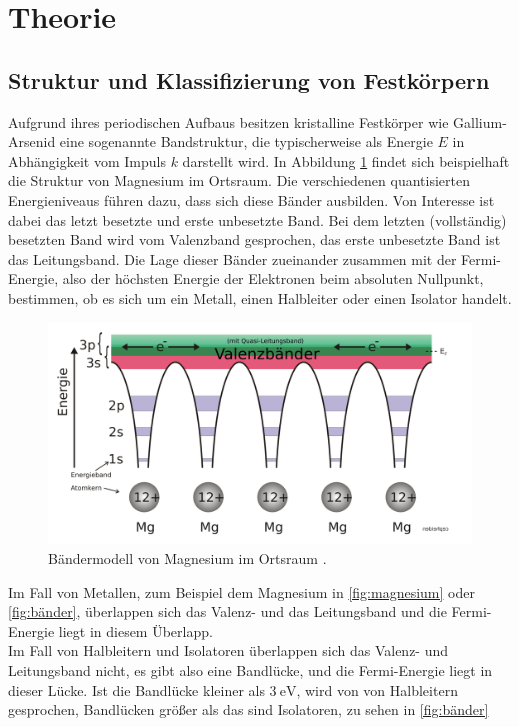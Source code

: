 \section{Theorie}
\label{sec:Theorie}

\subsection{Struktur und Klassifizierung von Festkörpern}
Aufgrund ihres periodischen Aufbaus besitzen kristalline Festkörper wie Gallium-Arsenid eine sogenannte Bandstruktur, die typischerweise als Energie $E$ in Abhängigkeit vom Impuls $k$ darstellt wird.
In Abbildung \ref{fig:magnesium}
findet sich beispielhaft die Struktur von Magnesium im Ortsraum. Die verschiedenen quantisierten Energieniveaus führen dazu, dass sich diese Bänder ausbilden. Von Interesse ist dabei das letzt besetzte und erste unbesetzte Band.
Bei dem letzten (vollständig) besetzten Band wird vom Valenzband gesprochen, das erste unbesetzte Band ist das Leitungsband. Die Lage dieser Bänder zueinander zusammen mit der Fermi-Energie, also der höchsten Energie der Elektronen
beim absoluten Nullpunkt, bestimmen, ob es sich um ein Metall, einen Halbleiter oder einen Isolator handelt.

\begin{figure}[H]
    \centering
    \includegraphics[width=\textwidth]{Bilder/Bändermodell-Potentialtöpfe-Mg.svg.png}
    \caption{Bändermodell von Magnesium im Ortsraum \cite{magnesium}. }
    \label{fig:magnesium}
\end{figure}
Im Fall von Metallen, zum Beispiel dem Magnesium in \autoref{fig:magnesium} oder \autoref{fig:bänder},
überlappen sich das Valenz- und das Leitungsband und die Fermi-Energie liegt in diesem Überlapp. \\
Im Fall von Halbleitern und Isolatoren überlappen sich das Valenz- und Leitungsband nicht, es gibt also eine Bandlücke, und die Fermi-Energie liegt in dieser Lücke. Ist die Bandlücke kleiner als $\qty{3}{\electronvolt}$, wird von von Halbleitern gesprochen,
Bandlücken größer als das sind Isolatoren, zu sehen in \autoref{fig:bänder}

